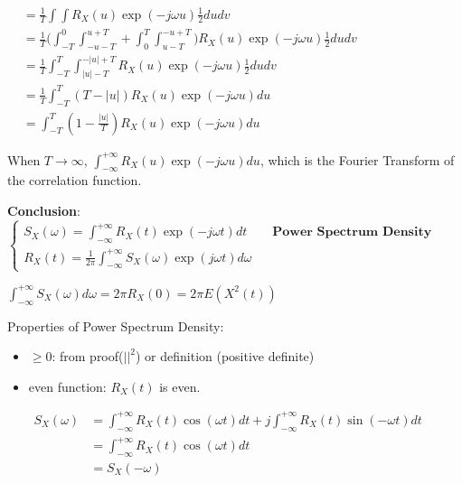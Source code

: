\documentclass[a4paper]{article}
\begin{document}
\begin{enumerate}
\begin{enumerate}
\begin{figure}[H]
\begin{minipage}{0.48\textwidth}
    \end{minipage}
  \end{figure}

  \end{enumerate}

  $\begin{aligned}
    &=\frac 1T\int\int R_X(u)\exp(-j\omega u)\frac 12 dudv \\
    &=\frac 1T\bigl(\int_{-T}^{0}\int_{-u-T}^{u+T}+\int_0^T\int_{u-T}^{-u+T}\bigr)R_X(u)\exp(-j\omega u)\frac 12 dudv \\
    &=\frac 1T \int_{-T}^T\int_{|u|-T}^{-|u|+T}R_X(u)\exp(-j\omega u)\frac 12 dudv \\
    &=\frac 1T\int_{-T}^T(T-|u|)R_X(u)\exp(-j\omega u)du \\
    &=\int_{-T}^T(1-\frac{|u|}{T})R_X(u)\exp(-j\omega u)du
  \end{aligned}$

  When $T\to\infty$, $\int_{-\infty}^{+\infty}R_X(u)\exp(-j\omega u)du$, which is the Fourier Transform of the correlation function.

  \textbf{Conclusion}: $
  \begin{cases}
    S_X(\omega)=\int_{-\infty}^{+\infty}R_X(t)\exp(-j\omega t)dt\qquad\textbf{Power Spectrum Density}\\
    R_X(t)=\frac{1}{2\pi}\int_{-\infty}^{+\infty}S_X(\omega)\exp(j\omega t)d\omega
  \end{cases}
    $

    $\int_{-\infty}^{+\infty}S_X(\omega)d\omega=2\pi R_X(0)=2\pi E(X^2(t))$

    Properties of Power Spectrum Density:
    \begin{itemize}
      \item $\geq 0$: from proof($||^2$) or definition (positive definite)
      \item even function: $R_X(t)$ is even.

        $\begin{aligned}S_X(\omega)&=\int_{-\infty}^{+\infty}R_X(t)\cos(\omega t) dt + j\int_{-\infty}^{+\infty}R_X(t)\sin(-\omega t) dt \\
          &=\int_{-\infty}^{+\infty}R_X(t)\cos(\omega t) dt \\
          &=S_X(-\omega)
        \end{aligned}$
    \end{itemize}


\end{enumerate}
\end{document}
